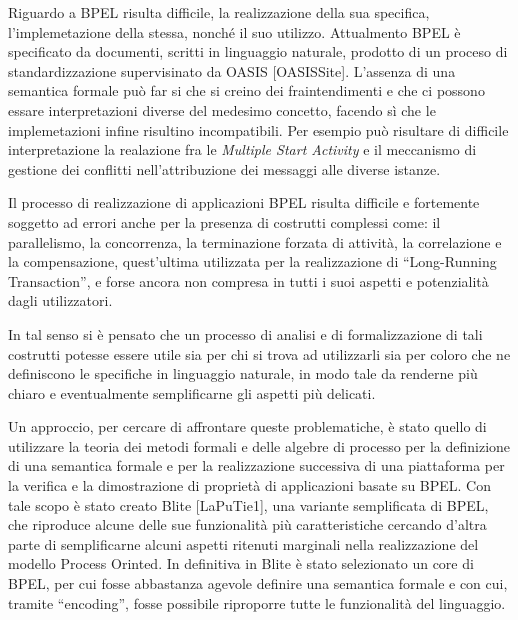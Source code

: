 Riguardo a BPEL risulta difficile, la realizzazione della sua specifica,
l'implemetazione della stessa, nonché il suo utilizzo. Attualmento BPEL è
specificato da documenti, scritti in linguaggio naturale, prodotto di un proceso
di standardizzazione supervisinato da OASIS [OASISSite]. L'assenza di una
semantica formale può far si che si creino dei fraintendimenti e che ci possono
essare interpretazioni diverse del medesimo concetto, facendo sì che le
implemetazioni infine risultino incompatibili. Per esempio può risultare di
difficile interpretazione la realazione fra le \emph{Multiple Start Activity} e
il meccanismo di gestione dei conflitti nell'attribuzione dei messaggi alle
diverse istanze. 

Il processo di realizzazione di applicazioni BPEL
risulta difficile e fortemente soggetto ad errori anche per la presenza di
costrutti complessi come: il parallelismo, la concorrenza, la terminazione
forzata di attività, la correlazione e la compensazione, quest'ultima utilizzata
per la realizzazione di ``Long-Running Transaction'', e forse ancora non 
compresa in tutti i suoi aspetti e potenzialità dagli utilizzatori. 

In tal senso si è pensato che un processo di analisi e di formalizzazione di tali
costrutti potesse essere utile sia per chi si trova ad utilizzarli sia per coloro
che ne definiscono le specifiche in linguaggio naturale, in modo tale da renderne
più chiaro e eventualmente semplificarne gli aspetti più delicati.

Un approccio, per cercare di affrontare queste problematiche, è stato quello di
utilizzare la teoria dei metodi formali e delle algebre di processo per la
definizione di una semantica formale e per la realizzazione successiva di una
piattaforma per la verifica e la dimostrazione di proprietà di applicazioni
basate su BPEL. Con tale scopo è stato creato Blite [LaPuTie1], una variante
semplificata di BPEL, che riproduce alcune delle sue funzionalità più
caratteristiche cercando d'altra parte di semplificarne alcuni aspetti ritenuti
marginali nella realizzazione del modello Process Orinted. In definitiva in
Blite è stato selezionato un core di BPEL, per cui fosse abbastanza agevole
definire una semantica formale e con cui, tramite ``encoding'', fosse possibile riproporre
tutte le funzionalità del linguaggio.


